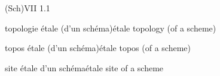 
(Sch)\qquad VII 1.1

\margin{\unsure{-}}
topologie étale (d'un schéma)\quad étale topology (of a\unsure{)} scheme)

topos étale (d'un schéma)\quad étale topos (of a scheme)

site étale d'un schéma\quad étale site of a scheme
